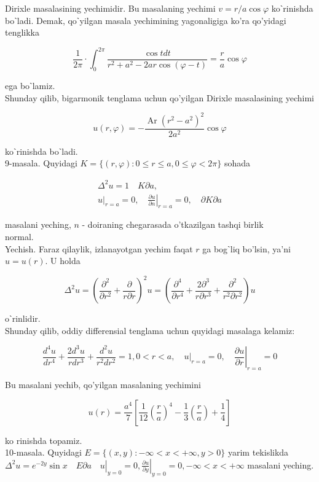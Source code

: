 \documentclass[10pt]{article}
\begin{document}
Dirixle masalasining yechimidir. Bu masalaning yechimi $v=r / a \cos \varphi$ koˋrinishda boˋladi. Demak, qoˋyilgan masala yechimining yagonaligiga ko'ra qo'yidagi tenglikka

$$
\frac{1}{2 \pi} \cdot \int_{0}^{2 \pi} \frac{\cos t d t}{r^{2}+a^{2}-2 a r \cos (\varphi-t)}=\frac{r}{a} \cos \varphi
$$

ega boˋlamiz.\\
Shunday qilib, bigarmonik tenglama uchun qo'yilgan Dirixle masalasining yechimi

$$
u(r, \varphi)=-\frac{\operatorname{Ar}\left(r^{2}-a^{2}\right)^{2}}{2 a^{2}} \cos \varphi
$$

koˋrinishda boˋladi.\\
9-masala. Quyidagi $K=\{(r, \varphi): 0 \leq r \leq a, 0 \leq \varphi<2 \pi\}$ sohada

$$
\begin{gathered}
\Delta^{2} u=1 \quad K \partial a, \\
\left.u\right|_{r=a}=0,\left.\quad \frac{\partial u}{\partial n}\right|_{r=a}=0, \quad \partial K \partial a
\end{gathered}
$$

masalani yeching, $n$ - doiraning chegarasada o'tkazilgan tashqi birlik\\
normal.\\
Yechish. Faraz qilaylik, izlanayotgan yechim faqat $r$ ga bogˋliq bo'lsin, ya'ni $u=u(r)$. U holda

$$
\Delta^{2} u=\left(\frac{\partial^{2}}{\partial r^{2}}+\frac{\partial}{r \partial r}\right)^{2} u=\left(\frac{\partial^{4}}{\partial r^{4}}+\frac{2 \partial^{3}}{r \partial r^{3}}+\frac{\partial^{2}}{r^{2} \partial r^{2}}\right) u
$$

oˋrinlidir.\\
Shunday qilib, oddiy differensial tenglama uchun quyidagi masalaga kelamiz:

$$
\frac{d^{4} u}{d r^{4}}+\frac{2 d^{3} u}{r d r^{3}}+\frac{d^{2} u}{r^{2} d r^{2}}=1,0<r<a,\left.\quad u\right|_{r=a}=0,\left.\quad \frac{\partial u}{\partial r}\right|_{r=a}=0
$$

Bu masalani yechib, qo'yilgan masalaning yechimini

$$
u(r)=\frac{a^{4}}{7}\left[\frac{1}{12}\left(\frac{r}{a}\right)^{4}-\frac{1}{3}\left(\frac{r}{a}\right)+\frac{1}{4}\right]
$$

ko rinishda topamiz.\\
10-masala. Quyidagi $E=\{(x, y):-\infty<x<+\infty, y>0\}$ yarim tekislikda $\Delta^{2} u=\left.e^{-2 y} \sin x \quad E \partial a \quad u\right|_{y=0}=0,\left.\frac{\partial u}{\partial y}\right|_{y=0}=0,-\infty<x<+\infty$ masalani yeching.
\end{document}
